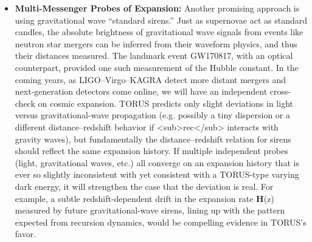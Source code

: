 \documentclass[
]{article}
\begin{document}
\begin{itemize}
  by Planck CMB results under \LambdaCDM. TORUS provides a framework where the
  recursion-induced extra gravity term could manifest as a subtle
  lensing shear effect that suppresses the growth of structure on
  certain scales, offering a possible explanation for this discrepancy.
  Future surveys will clarify this: LSST and Euclid will measure the
  growth rate and clustering amplitude to unprecedented accuracy,
  tracking structure formation from early times to now. If they confirm
  a persistent deviation -- for example, a scale-dependent growth rate
  or an S\textless sub\textgreater8\textless/sub\textgreater{} value
  that remains significantly lower than \LambdaCDM predicts (say, by
  \textgreater5\% even with improving precision) -- it could be a
  signature of TORUS's extra gravity influence. Conversely, if structure
  growth and clustering amplitude perfectly match the \LambdaCDM predictions
  as observational uncertainties shrink (within \textasciitilde1\%), it
  would constrain or rule out any need for a recursion-based
  modification in the dark energy or gravity sector (Predictive
  Framework §3.2).
\item
  \textbf{Multi-Messenger Probes of Expansion:} Another promising
  approach is using gravitational wave ``standard sirens.'' Just as
  supernovae act as standard candles, the absolute brightness of
  gravitational wave signals from events like neutron star mergers can
  be inferred from their waveform physics, and thus their distances
  measured. The landmark event GW170817, with an optical counterpart,
  provided one such measurement of the Hubble constant. In the coming
  years, as LIGO--Virgo--KAGRA detect more distant mergers and
  next-generation detectors come online, we will have an independent
  cross-check on cosmic expansion. TORUS predicts only slight deviations
  in light versus gravitational-wave propagation (e.g. possibly a tiny
  dispersion or a different distance--redshift behavior if
  \Lambda\textless sub\textgreater rec\textless/sub\textgreater{} interacts
  with gravity waves), but fundamentally the distance--redshift relation
  for sirens should reflect the same expansion history. If multiple
  independent probes (light, gravitational waves, etc.) all converge on
  an expansion history that is ever so slightly inconsistent with \LambdaCDM
  yet consistent with a TORUS-type varying dark energy, it will
  strengthen the case that the deviation is real. For example, a subtle
  redshift-dependent drift in the expansion rate \textbf{H}(z) measured
  by future gravitational-wave sirens, lining up with the pattern
  expected from recursion dynamics, would be compelling evidence in
  TORUS's favor.
\end{itemize}
\end{document}
